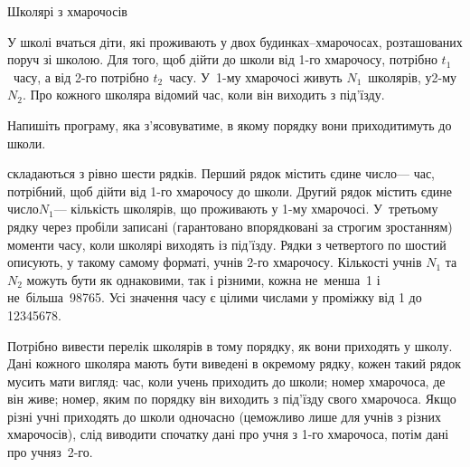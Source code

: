 ﻿\begin{problemAllDefault}{Школярі з хмарочосів}

У школі вчаться діти, які проживають у двох будинках--хмарочосах, розташованих поруч зі школою. Для того, щоб дійти до школи від \mbox{1-го} хмарочосу, потрібно $t_1$~часу, а від \mbox{2-го} потрібно $t_2$~часу. У~\mbox{1-му} хмарочосі живуть $N_1$~школярів, у\nolinebreak[3] \mbox{2-му}\nolinebreak[3] $N_2$. Про кожного школяра відомий час, коли він виходить з під’їзду.

Напишіть програму, яка з’ясовуватиме, в якому порядку вони приходитимуть до школи. 


\InputFile
складаються з рівно шести рядків. Перший рядок містить єдине число\nolinebreak[3] --- час, потрібний, щоб дійти від \mbox{1-го} хмарочосу до школи. Другий рядок містить єдине число\nolinebreak[3] $N_1$\nolinebreak[3] --- кількість школярів, що проживають у \mbox{1-му} хмарочосі. У~третьому рядку через пробіли записані (гарантовано впорядковані за строгим зростанням) моменти часу, коли школярі виходять із під’їзду. Рядки з четвертого по шостий описують, у такому самому форматі, учнів \mbox{2-го} хмарочосу. Кількості учнів $N_1$ та $N_2$ можуть бути як однаковими, так і різними, кожна не~менша~1 і не~більша~98765. Усі значення часу є цілими числами у проміжку від 1 до 12345678.

\OutputFile
Потрібно вивести перелік школярів в тому порядку, як вони приходять у школу. Дані кожного школяра мають бути виведені в окремому рядку, кожен такий рядок мусить мати вигляд: час, коли учень приходить до школи; номер хмарочоса, де він живе; номер, яким по порядку він виходить з під’їзду свого хмарочоса. Якщо різні учні приходять до школи одночасно (це\nolinebreak[4] можливо лише для учнів з різних хмарочосів), слід виводити спочатку дані про учня з \mbox{1-го}  хмарочоса, потім дані про учня\nolinebreak[3] з~\mbox{2-го}.

\Examples

\noindent\begin{exampleSimple}{7em}{7em}
%
\end{exampleSimple}


\end{problemAllDefault}